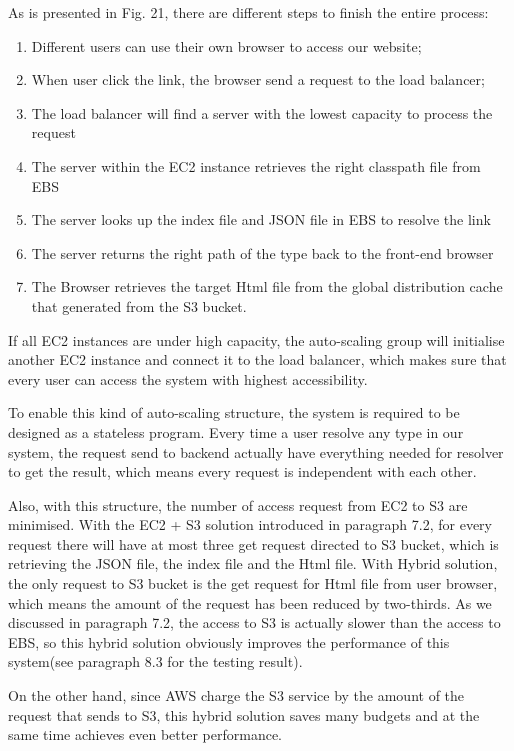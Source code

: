\documentclass[runningheads]{llncs}
\begin{document}
As is presented in Fig. 21, there are different steps to finish the entire process:

\begin{enumerate}
	\item Different users can use their own browser to access our website;
	\item When user click the link, the browser send a request to the load balancer;
	\item The load balancer will find a server with the lowest capacity to process the request
	\item The server within the EC2 instance retrieves the right classpath file from EBS
	\item The server looks up the index file and JSON file in EBS to resolve the link
	\item The server returns the right path of the type back to the front-end browser
	\item The Browser retrieves the target Html file from the global distribution cache that generated from the S3 bucket.

\end{enumerate}

If all EC2 instances are under high capacity, the auto-scaling group will initialise another EC2 instance and connect it to the load balancer, which makes sure that every user can access the system with highest accessibility.

To enable this kind of auto-scaling structure, the system is required to be designed as a stateless program. Every time a user resolve any type in our system, the request send to backend actually have everything needed for resolver to get the result, which means every request is independent with each other.

Also, with this structure, the number of access request from EC2 to S3 are minimised. With the EC2 + S3 solution introduced in paragraph 7.2, for every request there will have at most three get request directed to S3 bucket, which is retrieving the JSON file, the index file and the Html file. With Hybrid solution, the only request to S3 bucket is the get request for Html file from user browser, which means the amount of the request has been reduced by two-thirds. As we discussed in paragraph 7.2, the access to S3 is actually slower than the access to EBS, so this hybrid solution obviously improves the performance of this system(see paragraph 8.3 for the testing result).

On the other hand, since AWS charge the S3 service by the amount of the request that sends to S3, this hybrid solution saves many budgets and at the same time achieves even better performance.
\end{document}
